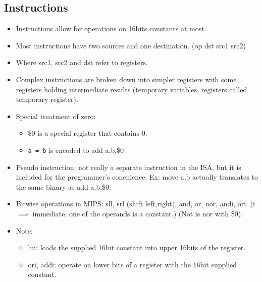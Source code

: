 \documentclass{report}
\begin{document}
\subsection{Instructions}
\begin{itemize}
\item Instructions allow for operations on 16bits constants at most.
\item Most instructions have two sources and one destination. (op dst src1 src2)
\item Where src1, src2 and dst refer to registers.
\item Complex instructions are broken down into simpler registers with some registers holding intermediate results (temporary variables, registers called temporary register).
\item Special treatment of zero:
\begin{itemize}
\item \$0 is a special register that contains 0.
\item \texttt{a = b} is encoded to add a,b,\$0
\end{itemize}
\item Pseudo instruction: not really a separate instruction in the ISA, but it is included for the programmer's conenience. Ex: move a,b actually translates to the same binary as add a,b,\$0.
\item Bitwise operations in MIPS: sll, srl (shift left,right), and, or, nor, andi, ori. (i $\implies$ immediate, one of the operands is a constant.) (Not is nor with \$0).
\item Note:
\begin{itemize}
    \item lui: loads the supplied 16bit constant into upper 16bits of the register.
    \item ori, addi: operate on lower bits of a register with the 16bit supplied constant.
\end{itemize}
\end{itemize}
\end{document}
